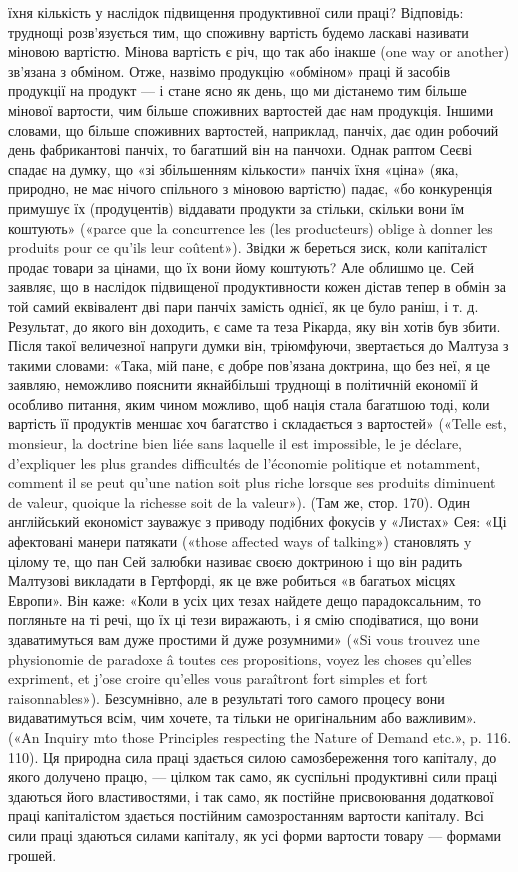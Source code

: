 {їхня кількість у наслідок підвищення продуктивної сили праці? Відповідь:
труднощі розв’язується тим, що споживну вартість будемо ласкаві
називати міновою вартістю. Мінова вартість є річ, що так або інакше
(one way or another) зв’язана з обміном. Отже, назвімо продукцію «обміном»
праці й засобів продукції на продукт — і стане ясно як день, що
ми дістанемо тим більше мінової вартости, чим більше споживних вартостей
дає нам продукція. Іншими словами, що більше споживних вартостей,
наприклад, панчіх, дає один робочий день фабрикантові панчіх,
то багатший він на панчохи. Однак раптом Сеєві спадає на думку, що «зі
збільшенням кількости» панчіх їхня «ціна» (яка, природно, не має нічого
спільного з міновою вартістю) падає, «бо конкуренція примушує їх (продуцентів)
віддавати продукти за стільки, скільки вони їм коштують»
(«parce que la concurrence les (les producteurs) oblige à donner les produits
pour ce qu’ils leur coûtent»). Звідки ж береться зиск, коли капіталіст
продає товари за цінами, що їх вони йому коштують? Але облишмо
це. Сей заявляє, що в наслідок підвищеної продуктивности кожен дістав
тепер в обмін за той самий еквівалент дві пари панчіх замість однієї, як
це було раніш, і т. д. Результат, до якого він доходить, є саме та теза
Рікарда, яку він хотів був збити. Після такої величезної напруги думки
він, тріюмфуючи, звертається до Малтуза з такими словами: «Така, мій
пане, є добре пов’язана доктрина, що без неї, я це заявляю, неможливо
пояснити якнайбільші труднощі в політичній економії й особливо питання,
яким чином можливо, щоб нація стала багатшою тоді, коли вартість її
продуктів меншає хоч багатство і складається з вартостей» («Telle est,
monsieur, la doctrine bien liée sans laquelle il est impossible, le je déclare,
d’expliquer les plus grandes difficultés de l’économie politique et notamment,
comment il se peut qu’une nation soit plus riche lorsque ses produits
diminuent de valeur, quoique la richesse soit de la valeur»). (Там же, стор.
170). Один англійський економіст зауважує з приводу подібних фокусів
у «Листах» Сея: «Ці афектовані манери патякати («those affected ways
of talking») становлять y цілому те, що пан Сей залюбки називає своєю
доктриною і що він радить Малтузові викладати в Гертфорді, як це вже
робиться «в багатьох місцях Европи». Він каже: «Коли в усіх цих тезах
найдете дещо парадоксальним, то погляньте на ті речі, що їх ці тези виражають,
і я смію сподіватися, що вони здаватимуться вам дуже простими
й дуже розумними» («Si vous trouvez une physionomie de paradoxe â
toutes ces propositions, voyez les choses qu’elles expriment, et j’ose croire
qu’elles vous paraîtront fort simples et fort raisonnables»). Безсумнівно,
але в результаті того самого процесу вони видаватимуться всім, чим хочете,
та тільки не оригінальним або важливим». («An Inquiry mto those
Principles respecting the Nature of Demand etc.», p. 116. 110).
} Ця природна сила праці здається силою самозбереження
того капіталу, до якого долучено працю, — цілком так само,
як суспільні продуктивні сили праці здаються його властивостями,
і так само, як постійне присвоювання додаткової праці
капіталістом здається постійним самозростанням вартости капіталу.
Всі сили праці здаються силами капіталу, як усі форми
вартости товару — формами грошей.

